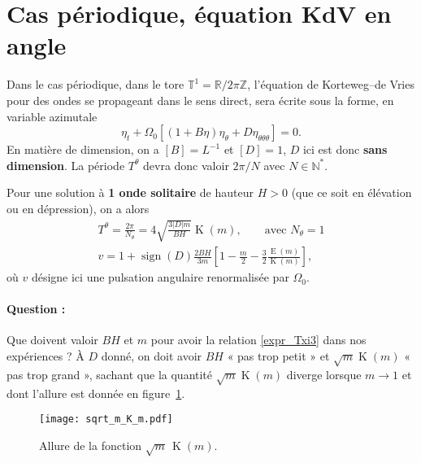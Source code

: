 \documentclass[10pt,a4paper, oneside, fleqn]{myarticle}
\newcommand{\Rset}{\mathbb{R}}
\newcommand{\Nset}{\mathbb{N}}
\newcommand{\Tset}{\mathbb{T}}
\newcommand{\Zset}{\mathbb{Z}}
\DeclareMathOperator{\sign}{sign}
\DeclareMathOperator{\ellipE}{E}
\DeclareMathOperator{\ellipK}{K}
\begin{document}
\section{Cas périodique, équation KdV en angle \boldmath{$\theta$}}
Dans le cas périodique, dans le tore $\Tset^1=\Rset/2\pi\Zset$, l'équation de Korteweg--de Vries pour des ondes se propageant dans le sens direct, sera écrite sous la forme, en variable azimutale
\begin{equation}
  \eta_t + \Omega_0\left[ (1 + B\eta) \eta_\theta + D\eta_{\theta\theta\theta}\right]=0. \label{KdVtheta}
\end{equation}
En matière de dimension, on a $[B]=L^{-1}$ et $[D]=1$, $D$ ici est donc \textbf{sans dimension}. La période $T^\theta$ devra donc valoir $2\pi/N$ avec $N\in\Nset^*$.


Pour une solution à \textbf{1 onde solitaire} de hauteur $H>0$ (que ce soit en élévation ou en dépression), on a alors
\begin{gather}
  T^\theta =  \frac{2\pi}{N_\theta} = 4 \sqrt{\frac{3|D|m}{BH}}\ellipK(m), \qquad{\text{avec } N_\theta=1}\label{expr_Txi3}\\
  v=1+\sign(D) \frac{2BH}{3m}\left[1-\frac{m}{2}-\frac{3}{2}\frac{\ellipE(m)}{\ellipK(m)}\right],\label{expr_vmoins1}
\end{gather}
où $v$ désigne ici une pulsation angulaire renormalisée par $\Omega_0$.
\paragraph{Question : }  Que doivent valoir $BH$ et $m$ pour avoir la relation \eqref{expr_Txi3} dans nos expériences ? À $D$ donné, on doit avoir $BH$ « pas trop petit » et $\sqrt{m}\ellipK(m)$ « pas trop grand », sachant que la quantité $\sqrt{m}\ellipK(m)$ diverge lorsque $m\to 1$ et dont l'allure est donnée en figure~\ref{fig:sqrt_m_K_m}.

\begin{figure}[ht!]
  \centering
  \texttt{[image: sqrt\_m\_K\_m.pdf]}
  \caption{Allure de la fonction $\sqrt{m}\,\ellipK (m)$.}\label{fig:sqrt_m_K_m}
\end{figure}
\end{document}
